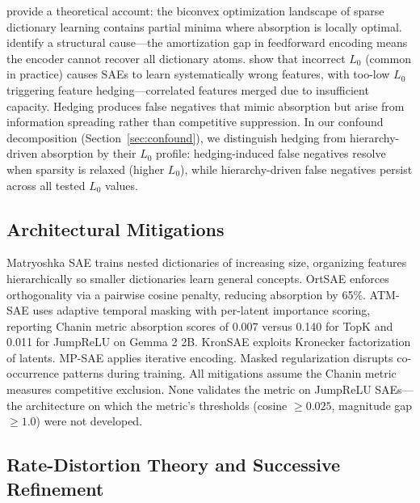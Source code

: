\documentclass{article}
\begin{document}
\citet{tang2025theoretical} provide a theoretical account: the biconvex optimization landscape of sparse dictionary learning contains partial minima where absorption is locally optimal. \citet{oneill2024amortization} identify a structural cause---the amortization gap in feedforward encoding means the encoder cannot recover all dictionary atoms. \citet{chanin2025hedging} show that incorrect $L_0$ (common in practice) causes SAEs to learn systematically wrong features, with too-low $L_0$ triggering feature hedging---correlated features merged due to insufficient capacity. Hedging produces false negatives that mimic absorption but arise from information spreading rather than competitive suppression. In our confound decomposition (Section~\ref{sec:confound}), we distinguish hedging from hierarchy-driven absorption by their $L_0$ profile: hedging-induced false negatives resolve when sparsity is relaxed (higher $L_0$), while hierarchy-driven false negatives persist across all tested $L_0$ values.

\subsection{Architectural Mitigations}

Matryoshka SAE \citep{bussmann2025matryoshka} trains nested dictionaries of increasing size, organizing features hierarchically so smaller dictionaries learn general concepts. OrtSAE \citep{korznikov2025ortsae} enforces orthogonality via a pairwise cosine penalty, reducing absorption by 65\%. ATM-SAE \citep{li2025atm} uses adaptive temporal masking with per-latent importance scoring, reporting Chanin metric absorption scores of 0.007 versus 0.140 for TopK and 0.011 for JumpReLU on Gemma 2 2B. KronSAE \citep{kronsae2025} exploits Kronecker factorization of latents. MP-SAE \citep{costa2025mpsae} applies iterative encoding. Masked regularization \citep{narayanaswamy2026masked} disrupts co-occurrence patterns during training. All mitigations assume the Chanin metric measures competitive exclusion. None validates the metric on JumpReLU SAEs---the architecture on which the metric's thresholds (cosine $\geq 0.025$, magnitude gap $\geq 1.0$) were not developed.

\subsection{Rate-Distortion Theory and Successive Refinement}
\end{document}
